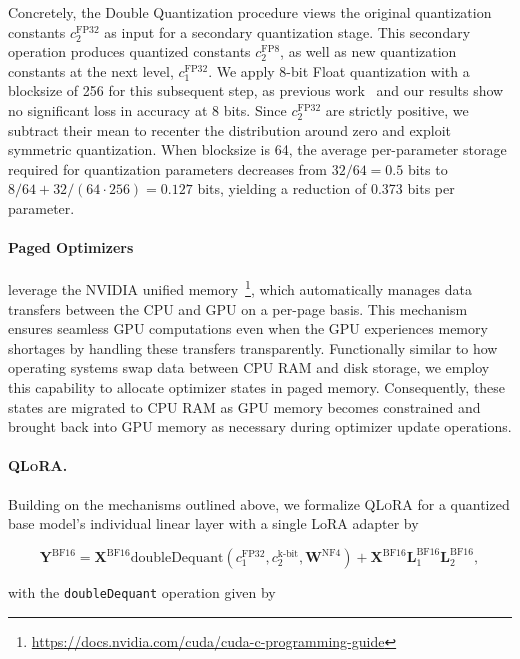 Concretely, the Double Quantization procedure views the original quantization constants $c_2^{\text{FP32}}$ as input for a secondary quantization stage. This secondary operation produces quantized constants $c_2^{\text{FP8}}$, as well as new quantization constants at the next level, $c_1^{\text{FP32}}$. We apply 8-bit Float quantization with a blocksize of 256 for this subsequent step, as previous work~\citep{dettmers2022case} and our results show no significant loss in accuracy at 8 bits. Since $c_2^{\text{FP32}}$ are strictly positive, we subtract their mean to recenter the distribution around zero and exploit symmetric quantization. When blocksize is 64, the average per-parameter storage required for quantization parameters decreases from $32/64 = 0.5$ bits to $8/64 + 32/(64\cdot256) = 0.127$ bits, yielding a reduction of 0.373 bits per parameter.

\paragraph{Paged Optimizers} leverage the NVIDIA unified memory~\footnote{\tiny \url{https://docs.nvidia.com/cuda/cuda-c-programming-guide}}, which automatically manages data transfers between the CPU and GPU on a per-page basis. This mechanism ensures seamless GPU computations even when the GPU experiences memory shortages by handling these transfers transparently. Functionally similar to how operating systems swap data between CPU RAM and disk storage, we employ this capability to allocate optimizer states in paged memory. Consequently, these states are migrated to CPU RAM as GPU memory becomes constrained and brought back into GPU memory as necessary during optimizer update operations.

\paragraph{\textsc{QLoRA}.} Building on the mechanisms outlined above, we formalize \textsc{QLoRA} for a quantized base model’s individual linear layer with a single LoRA adapter by

\begin{equation}
    \mathbf{Y}^{\text{BF16}} =  \mathbf{X}^{\text{BF16}} \text{doubleDequant}(c_1^{\text{FP32}}, c_2^{\text{k-bit}}, \mathbf{W}^{\text{NF4}}) + \mathbf{X}^{\text{BF16}}\mathbf{L}^{\text{BF16}}_1\mathbf{L}^{\text{BF16}}_2,
\end{equation}

with the \texttt{doubleDequant} operation given by

